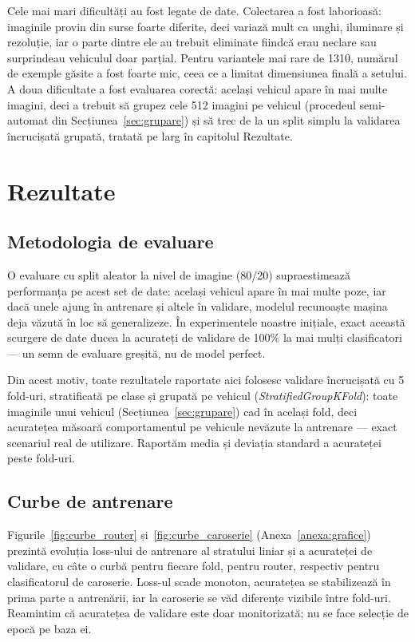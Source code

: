\documentclass[12pt, a4paper, openany]{book}
\begin{document}
Cele mai mari dificultăți au fost legate de date. Colectarea a fost laborioasă: imaginile provin din surse foarte diferite, deci variază mult ca unghi, iluminare și rezoluție, iar o parte dintre ele au trebuit eliminate fiindcă erau neclare sau surprindeau vehiculul doar parțial. Pentru variantele mai rare de 1310, numărul de exemple găsite a fost foarte mic, ceea ce a limitat dimensiunea finală a setului. A doua dificultate a fost evaluarea corectă: același vehicul apare în mai multe imagini, deci a trebuit să grupez cele 512 imagini pe vehicul (procedeul semi-automat din Secțiunea~\ref{sec:grupare}) și să trec de la un split simplu la validarea încrucișată grupată, tratată pe larg în capitolul Rezultate.

\chapter{Rezultate}

\section{Metodologia de evaluare}

O evaluare cu split aleator la nivel de imagine (80/20) supraestimează performanța pe acest set de date: același vehicul apare în mai multe poze, iar dacă unele ajung în antrenare și altele în validare, modelul recunoaște mașina deja văzută în loc să generalizeze. În experimentele noastre inițiale, exact această scurgere de date ducea la acurateți de validare de 100\% la mai mulți clasificatori --- un semn de evaluare greșită, nu de model perfect.

Din acest motiv, toate rezultatele raportate aici folosesc validare încrucișată cu 5 fold-uri, stratificată pe clase și grupată pe vehicul (\textit{StratifiedGroupKFold}): toate imaginile unui vehicul (Secțiunea~\ref{sec:grupare}) cad în același fold, deci acuratețea măsoară comportamentul pe vehicule nevăzute la antrenare --- exact scenariul real de utilizare. Raportăm media și deviația standard a acurateței peste fold-uri.

\section{Curbe de antrenare}

Figurile~\ref{fig:curbe_router} și~\ref{fig:curbe_caroserie} (Anexa~\ref{anexa:grafice}) prezintă evoluția loss-ului de antrenare al stratului liniar și a acurateței de validare, cu câte o curbă pentru fiecare fold, pentru router, respectiv pentru clasificatorul de caroserie. Loss-ul scade monoton, acuratețea se stabilizează în prima parte a antrenării, iar la caroserie se văd diferențe vizibile între fold-uri. Reamintim că acuratețea de validare este doar monitorizată; nu se face selecție de epocă pe baza ei.
\end{document}
